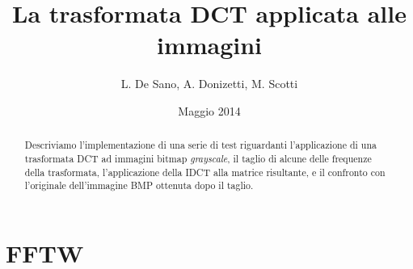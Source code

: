 \documentclass[11pt,a4paper]{scrartcl}
\author{L. De Sano, A. Donizetti, M. Scotti}
\title{La trasformata DCT applicata alle immagini}
\date{Maggio 2014}
\begin{document}
\maketitle
\begin{abstract}
Descriviamo l'implementazione di una serie di test riguardanti l'applicazione di una trasformata DCT ad immagini bitmap \textit{grayscale}, il taglio di alcune delle frequenze della trasformata, l'applicazione della IDCT alla matrice risultante, e il confronto con l'originale dell'immagine BMP ottenuta dopo il taglio.
\end{abstract}

\section*{FFTW}
\end{document}
